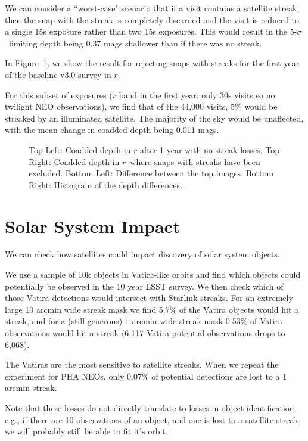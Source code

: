 We can consider a ``worst-case" scenario that if a visit contains a satellite streak, then the snap with the streak is completely discarded and the visit is reduced to a single 15s exposure rather than two 15s exposures. This would result in the 5-$\sigma$\ limiting depth being 0.37 mags shallower than if there was no streak.

In Figure~\ref{fig:depth_change}, we show the result for rejecting snaps with streaks for the first year of the baseline v3.0 survey in $r$. 

For this subset of exposures ($r$ band in the first year, only 30s visits so no twilight NEO observations), we find that of the 44,000 visits, 5\% would be streaked by an illuminated satellite. The majority of the sky would be unaffected, with the mean change in coadded depth being 0.011 mags. 

\begin{figure}
\caption{ Top Left: Coadded depth in $r$ after 1 year with no streak losses. Top Right: Coadded depth in $r$\ where snaps with streaks have been excluded. Bottom Left: Difference between the top images. Bottom Right: Histogram of the depth differences. \label{fig:depth_change}}
\end{figure}



\section{Solar System Impact}

We can check how satellites could impact discovery of solar system objects. 

We use a sample of 10k objects in Vatira-like orbits and find which objects could potentially be observed in the 10 year LSST survey. We then check which of those Vatira detections would intersect with Starlink streaks. For an extremely large 10 arcmin wide streak mask we find 5.7\% of the Vatira objects would hit a streak, and for a (still generous) 1 arcmin wide streak mask 0.53\% of Vatira observations would hit a streak (6,117 Vatira potential observations drops to 6,068). 

The Vatiras are the most sensitive to satellite streaks. When we repeat the experiment for PHA NEOs, only 0.07\% of potential detections are lost to a 1 arcmin streak. 

Note that these losses do not directly translate to losses in object identification, e.g., if there are 10 observations of an object, and one is lost to a satellite streak, we will probably still be able to fit it's orbit. 



